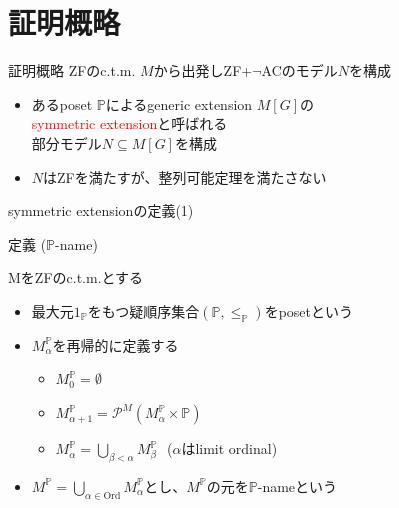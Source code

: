 \documentclass[17pt,aspectratio=169]{beamer}
\newcommand{\Pbb}{\mathbb{P}}
\begin{document}
\section{証明概略}
\begin{frame}{証明概略}
    ZFのc.t.m. $M$から出発しZF+$\neg$ACのモデル$N$を構成
    \begin{itemize}[itemsep=8pt]
        \item あるposet $\mathbb{P}$によるgeneric extension $M[G]$の\\
              \textcolor{red}{symmetric extension}と呼ばれる\\
              部分モデル$N \subseteq M[G]$を構成
        \item $N$はZFを満たすが、整列可能定理を満たさない
    \end{itemize}
\end{frame}

\begin{frame}{symmetric extensionの定義(1)}
    \vspace{-5pt}
    \begin{itembox}[l]{定義 ($\Pbb$-name)}
        {\small
            \vspace{-5pt}
            MをZFのc.t.m.とする
            \vspace{-8pt}
            \begin{itemize}[itemsep=1pt]
                \item 最大元$1_{\Pbb}$をもつ疑順序集合$(\Pbb, \le_{\Pbb})$をposetという 
                \item $M^{\Pbb}_{\alpha}$を再帰的に定義する 
                    \begin{itemize}
                       \item $M^{\Pbb}_0 = \emptyset$ 
                       \item  $M^{\Pbb}_{\alpha+1} = \mathcal{P}^M(M^{\Pbb}_{\alpha} \times \Pbb)$ 
                       \item  $M^{\Pbb}_{\alpha} = \bigcup_{\beta < \alpha} M^{\Pbb}_{\beta}$\,\,\,\,($\alpha$はlimit ordinal)
                    \end{itemize}
                \item $M^{\Pbb} = \bigcup_{\alpha \in \text{Ord}} M^{\Pbb}_{\alpha}$とし、$M^{\Pbb}$の元を$\Pbb$-nameという
            \end{itemize}            
        }
    \end{itembox}
\end{frame}
\end{document}
